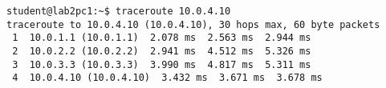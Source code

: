 \begin{lstlisting}
student@lab2pc1:~$ traceroute 10.0.4.10
traceroute to 10.0.4.10 (10.0.4.10), 30 hops max, 60 byte packets
 1  10.0.1.1 (10.0.1.1)  2.078 ms  2.563 ms  2.944 ms
 2  10.0.2.2 (10.0.2.2)  2.941 ms  4.512 ms  5.326 ms
 3  10.0.3.3 (10.0.3.3)  3.990 ms  4.817 ms  5.311 ms
 4  10.0.4.10 (10.0.4.10)  3.432 ms  3.671 ms  3.678 ms
\end{lstlisting}
